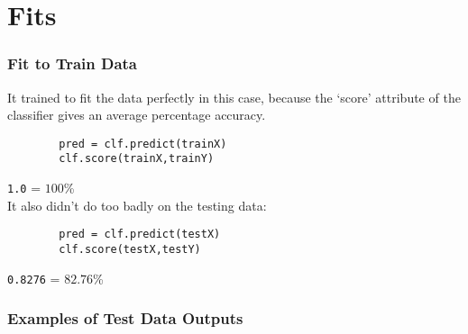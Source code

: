 \documentclass{beamer}
\begin{document}
\section{Fits}
	\begin{frame}[fragile]
		\frametitle{Fit to Train Data}
		It trained to fit the data perfectly in this case, because the `score' attribute of the classifier gives an average percentage accuracy.
		\begin{lstlisting}
		pred = clf.predict(trainX)
		clf.score(trainX,trainY)
		\end{lstlisting}
		\texttt{1.0} = $100$\%\\
		It also didn't do too badly on the testing data:
		\begin{lstlisting}
		pred = clf.predict(testX)
		clf.score(testX,testY)
		\end{lstlisting}
		\texttt{0.8276} = $82.76$\%
	\end{frame}
	\begin{frame}
		\frametitle{Examples of Test Data Outputs}
		\begin{figure}
			\centering
		\end{figure}
	\end{frame}
\end{document}
